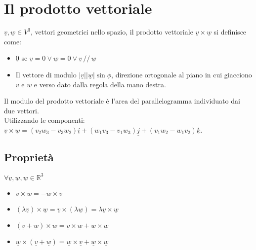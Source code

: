 \section{Il prodotto vettoriale}
$\underline{v},\underline{w}\in V^3$, vettori geometrici nello spazio, il prodotto vettoriale $\underline{v}\times\underline{w}$ si definisce come:
\begin{itemize}
\item $\underline{0}$ se $\underline{v}=0\lor\underline{w}=0\lor\underline{v}\,//\,\underline{w}$
\item Il vettore di modulo $|\underline{v}||\underline{w}|\sin \phi$, direzione ortogonale al piano in cui giacciono $\underline{v}$ e $\underline{w}$ e verso dato dalla 
regola della mano destra.
\end{itemize}
Il modulo del prodotto vettoriale \`e l'area del parallelogramma individuato dai due vettori.\\
Utilizzando le componenti: $\underline{v}\times\underline{w}=(v_2w_3-v_3w_2)\underline{i}+(w_1v_3-v_1w_3)\underline{j}+(v_1w_2-w_1v_2)\underline{k}$.
\subsection{Propriet\`a}
$\forall\underline{v},\underline{w},\underline{w}\in\mathbb{R}^3$
\begin{itemize}
\item $\underline{v}\times\underline{w}=-\underline{w}\times\underline{v}$
\item $(\lambda\underline{v})\times\underline{w}=\underline{v}\times(\lambda\underline{w})=\lambda\underline{v}\times\underline{w}$
\item $(\underline{v}+\underline{w})\times\underline{w}=\underline{v}\times\underline{w}+\underline{w}\times\underline{w}$
\item $\underline{w}\times(\underline{v}+\underline{w})=\underline{w}\times\underline{v}+\underline{w}\times\underline{w}$
\end{itemize}
